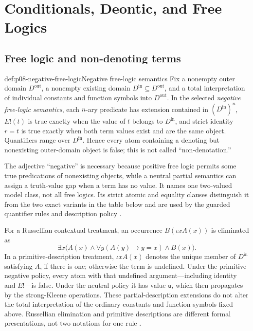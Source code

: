 \chapter{Conditionals, Deontic, and Free Logics}
\label{sec:p08-conditionals-deontic-free}

\section{Free logic and non-denoting terms}

\begin{hbdefinition}{def:p08-negative-free-logic}{Negative free-logic semantics}
Fix a nonempty outer domain \(D^{\mathrm{out}}\), a nonempty existing domain
\(D^{\mathrm{in}}\subseteq D^{\mathrm{out}}\), and a total interpretation of
individual constants and function symbols into \(D^{\mathrm{out}}\).  In the
selected \emph{negative free-logic semantics}, each \(n\)-ary predicate has
extension contained in \((D^{\mathrm{in}})^n\),
\(E!(t)\) is true exactly when the value of \(t\) belongs to
\(D^{\mathrm{in}}\), and strict identity \(r=t\) is true exactly when both
term values exist and are the same object.  Quantifiers range over
\(D^{\mathrm{in}}\).  Hence every atom containing a denoting but nonexisting
outer-domain object is false; this is not called ``non-denotation.''

The adjective ``negative'' is necessary because positive free logic permits
some true predications of nonexisting objects, while a neutral partial
semantics can assign a truth-value gap when a term has no value.  It names one
two-valued model class, not all free logics.  Its strict atomic and equality
clauses distinguish it from the two exact variants in the table below and are
used by the guarded quantifier rules and description policy
\cite{Lambert1967,Bencivenga1986}.
\end{hbdefinition}

For a Russellian contextual treatment, an occurrence
\(B(\iota xA(x))\) is eliminated as
\[
 \exists x\bigl(A(x)\land
   \forall y(A(y)\to y=x)\land B(x)\bigr).
\]
In a primitive-description treatment, \(\iota xA(x)\) denotes the unique
member of \(D^{\mathrm{in}}\) satisfying \(A\), if there is one; otherwise the
term is undefined.  Under the primitive negative policy, every atom with that
undefined argument---including identity and \(E!\)---is false.  Under the
neutral policy it has value \(\mathsf u\), which then propagates by the
strong-Kleene operations.  These partial-description extensions do not alter
the total interpretation of the ordinary constants and function symbols fixed
above.  Russellian elimination and primitive descriptions are different formal
presentations, not two notations for one rule
\cite{Russell1905,Lehmann2002}.

